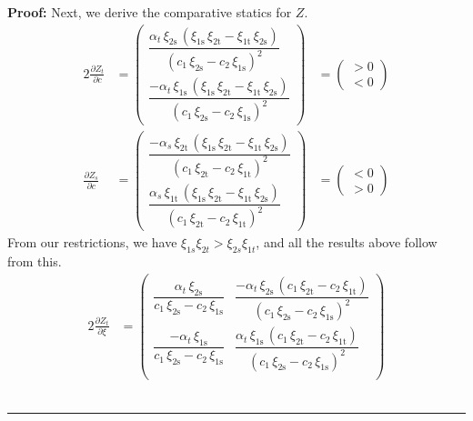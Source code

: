 \documentclass[11pt,a4paper]{extarticle}
\newenvironment{proof}[1][Proof]{\noindent\textbf{#1:} }{\ \rule{0.5em}{0.5em}}
\begin{document}
\begin{proof}
	Next, we derive the comparative statics for $Z$. 
	\begin{alignat*}{2}
	\frac{\partial Z_t}{\partial c} &= 
	\begin{pmatrix}
	\dfrac{\alpha _{t}\,\xi _{\mathrm{2s}}\,\left(\xi _{\mathrm{1s}}\,\xi _{\mathrm{2t}}-\xi _{\mathrm{1t}}\,\xi _{\mathrm{2s}}\right)}{{\left(c_{1}\,\xi _{\mathrm{2s}}-c_{2}\,\xi _{\mathrm{1s}}\right)}^2}\\
	\dfrac{-\alpha _{t}\,\xi _{\mathrm{1s}}\,\left(\xi _{\mathrm{1s}}\,\xi _{\mathrm{2t}}-\xi _{\mathrm{1t}}\,\xi _{\mathrm{2s}}\right)}{{\left(c_{1}\,\xi _{\mathrm{2s}}-c_{2}\,\xi _{\mathrm{1s}}\right)}^2}
	\end{pmatrix}
	&=
	\begin{pmatrix}
	> 0 \\
	< 0 
	\end{pmatrix} \\
	\frac{\partial Z_s}{\partial c} &= 
	\begin{pmatrix}
	\dfrac{-\alpha _{s}\,\xi _{\mathrm{2t}}\,\left(\xi _{\mathrm{1s}}\,\xi _{\mathrm{2t}}-\xi _{\mathrm{1t}}\,\xi _{\mathrm{2s}}\right)}{{\left(c_{1}\,\xi _{\mathrm{2t}}-c_{2}\,\xi _{\mathrm{1t}}\right)}^2} \\
	\dfrac{\alpha _{s}\,\xi _{\mathrm{1t}}\,\left(\xi _{\mathrm{1s}}\,\xi _{\mathrm{2t}}-\xi _{\mathrm{1t}}\,\xi _{\mathrm{2s}}\right)}{{\left(c_{1}\,\xi _{\mathrm{2t}}-c_{2}\,\xi _{\mathrm{1t}}\right)}^2}
	\end{pmatrix}
	&=
	\begin{pmatrix}
	< 0 \\
	> 0 
	\end{pmatrix}
	\end{alignat*}
	From our restrictions, we have $\xi_{1s}\xi_{2t} > \xi_{2s}\xi_{1t}$, and all the results above follow from this. 
	\begin{alignat*}{2}
	\frac{\partial Z_t}{\partial \xi} &= 
	\begin{pmatrix}
	\dfrac{\alpha _{t}\,\xi _{\mathrm{2s}}}{c_{1}\,\xi _{\mathrm{2s}}-c_{2}\,\xi _{\mathrm{1s}}} & \dfrac{-\alpha _{t}\,\xi _{\mathrm{2s}}\,\left(c_{1}\,\xi _{\mathrm{2t}}-c_{2}\,\xi _{\mathrm{1t}}\right)}{{\left(c_{1}\,\xi _{\mathrm{2s}}-c_{2}\,\xi _{\mathrm{1s}}\right)}^2} \\
	\dfrac{-\alpha _{t}\,\xi _{\mathrm{1s}}}{c_{1}\,\xi _{\mathrm{2s}}-c_{2}\,\xi _{\mathrm{1s}}} & \dfrac{\alpha _{t}\,\xi _{\mathrm{1s}}\,\left(c_{1}\,\xi _{\mathrm{2t}}-c_{2}\,\xi _{\mathrm{1t}}\right)}{{\left(c_{1}\,\xi _{\mathrm{2s}}-c_{2}\,\xi _{\mathrm{1s}}\right)}^2} \\

\end{pmatrix}
\end{alignat*}
\end{proof}
\end{document}
